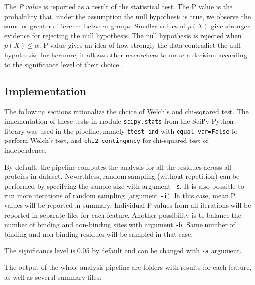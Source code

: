 The \textit{P value} is reported as a result of the statistical test. The P value is the probability that, under the assumption the null hypothesis is true, we observe the same or greater difference between groups. Smaller values of $p(X)$ give stronger evidence for rejecting the null hypothesis. The null hypothesis is rejected when $p(X) \leq \alpha$. P value gives an idea of how strongly the data contradict the null hypothesis; furthermore, it allows other researchers to make a decision according to the significance level of their choice \cite{pvalue, sham_purcell, lehmann}.

\subsection{Implementation}

The following sections rationalize the choice of Welch's and chi-squared test. The imlementation of these tests in module \texttt{scipy.stats} from the SciPy Python library \cite{scipy} was used in the pipeline; namely \texttt{ttest\_ind} with \texttt{equal\_var=False} to perform Welch's test, and \texttt{chi2\_contingency} for chi-squared test of independence.

By default, the pipeline computes the analysis for all the residues across all proteins in dataset. Neverthless, random sampling (without repetition) can be performed by specifying the sample size with argument \texttt{-s}. It is also possible to run more iterations of random sampling (argument \texttt{-i}). In this case, mean P values will be reported in summary. Individual P values from all iterations will be reported in separate files for each feature. Another possibility is to balance the number of binding and non-binding sites with argument \texttt{-b}. Same number of binding and non-binding residues will be sampled in that case.

The significance level is 0.05 by default and can be changed with \texttt{-a} argument.

The output of the whole analysis pipeline are folders with results for each feature, as well as several summary files:

